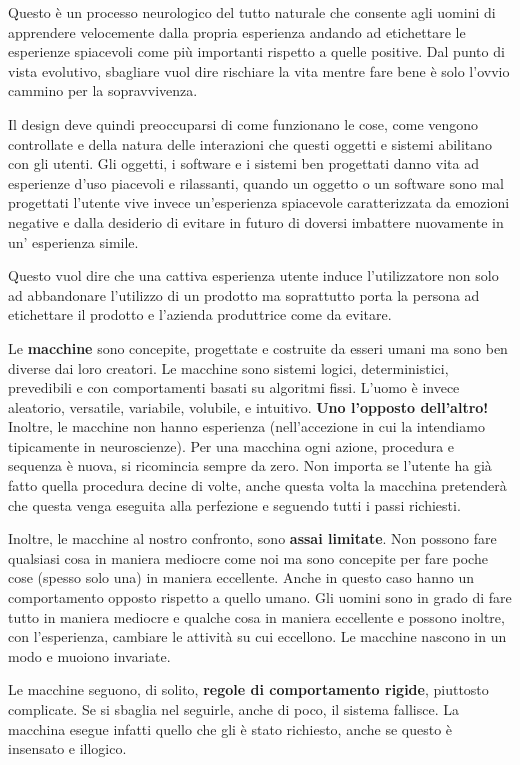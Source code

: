 Questo è un processo neurologico del tutto naturale che consente agli uomini di apprendere velocemente dalla propria esperienza andando ad etichettare le esperienze spiacevoli come più importanti rispetto a quelle positive. Dal punto di vista evolutivo, sbagliare vuol dire rischiare la vita mentre fare bene è solo l'ovvio cammino per la sopravvivenza.

Il design deve quindi preoccuparsi di come funzionano le cose, come vengono controllate e della natura delle interazioni che questi oggetti e sistemi abilitano con gli utenti. Gli oggetti, i software e i sistemi ben progettati danno vita ad esperienze d'uso piacevoli e rilassanti, quando un oggetto o un software sono mal progettati l'utente vive invece un'esperienza spiacevole caratterizzata da emozioni negative e dalla desiderio di evitare in futuro di doversi imbattere nuovamente in un' esperienza simile.

Questo vuol dire che una cattiva esperienza utente induce l'utilizzatore non solo ad abbandonare l'utilizzo di un prodotto ma soprattutto porta la persona ad etichettare il prodotto e l'azienda produttrice come da evitare. 

Le \textbf{macchine} sono concepite, progettate e costruite da esseri umani ma sono ben diverse dai loro creatori. Le macchine sono sistemi logici, deterministici, prevedibili e con comportamenti basati su algoritmi fissi. L'uomo è invece aleatorio, versatile, variabile, volubile, e intuitivo. \textbf{Uno l'opposto dell'altro!}
Inoltre, le macchine non hanno esperienza (nell'accezione in cui la intendiamo tipicamente in neuroscienze). Per una macchina ogni azione, procedura e sequenza è nuova, si ricomincia sempre da zero. Non importa se l'utente ha già fatto quella procedura decine di volte, anche questa volta la macchina pretenderà che questa venga eseguita alla perfezione e seguendo tutti i passi richiesti.

Inoltre, le macchine al nostro confronto, sono \textbf{assai limitate}. Non possono fare qualsiasi cosa in maniera mediocre come noi ma sono concepite per fare poche cose (spesso solo una) in maniera eccellente. Anche in questo caso hanno un comportamento opposto rispetto a quello umano. Gli uomini sono in grado di fare tutto in maniera mediocre e qualche cosa in maniera eccellente e possono inoltre, con l'esperienza, cambiare le attività su cui eccellono. Le macchine nascono in un modo e muoiono invariate.

Le macchine seguono, di solito, \textbf{regole di comportamento rigide}, piuttosto complicate. Se si sbaglia nel seguirle, anche di poco, il sistema fallisce. La macchina esegue infatti quello che gli è stato richiesto, anche se questo è insensato e illogico. 

